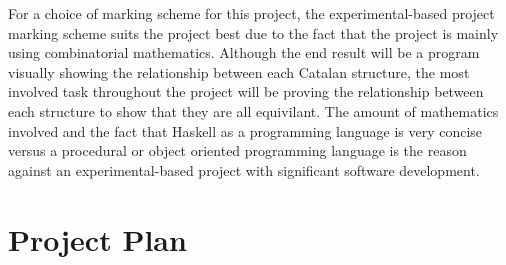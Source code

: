 \documentclass[10pt]{article}
\begin{document}
For a choice of marking scheme for this project, the experimental-based project marking scheme suits the project best due to the fact that the project is mainly using combinatorial mathematics. Although the end result will be a program visually showing the relationship between each Catalan structure, the most involved task throughout the project will be proving the relationship between each structure to show that they are all equivilant. The amount of mathematics involved and the fact that Haskell as a programming language is very concise versus a procedural or object oriented programming language is the reason against an experimental-based project with significant software development. 

\section{Project Plan}
\end{document}
